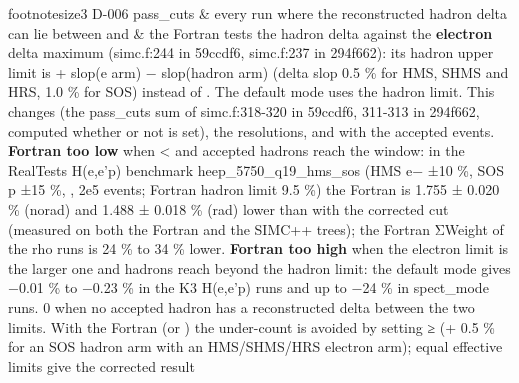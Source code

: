 \begin{simctable}{footnotesize}{3}
D-006 pass\_cuts & every run where the reconstructed hadron delta can lie between  and  & the Fortran tests the hadron delta against the \textbf{electron} delta maximum (simc.f:244 in 59ccdf6, simc.f:237 in 294f662): its hadron upper limit is  + slop(e arm) − slop(hadron arm) (delta slop 0.5 \% for HMS, SHMS and HRS, 1.0 \% for SOS) instead of . The default mode uses the hadron limit. This changes  (the pass\_cuts sum of simc.\allowbreak{}f:\allowbreak{}318-320 in 59ccdf6, 311-313 in 294f662, computed whether or not  is set), the resolutions,\allowbreak{} and with  the accepted events. \textbf{Fortran too low} when  <  and accepted hadrons reach the window: in the RealTests H(e,e'p) benchmark heep\_\allowbreak{}5750\_\allowbreak{}q19\_\allowbreak{}hms\_\allowbreak{}sos (HMS e− ±10 \%, SOS p ±15 \%, , 2e5 events; Fortran hadron limit 9.5 \%) the Fortran  is 1.755 ± 0.020 \% (norad) and 1.488 ± 0.018 \% (rad) lower than with the corrected cut (measured on both the Fortran and the SIMC++ trees); the Fortran ΣWeight of the rho runs is 24 \% to 34 \% lower. \textbf{Fortran too high} when the electron limit is the larger one and hadrons reach beyond the hadron limit: the default mode gives −0.01 \% to −0.23 \% in the K3 H(e,e'p) runs and up to −24 \% in spect\_mode runs. 0 when no accepted hadron has a reconstructed delta between the two limits. With the Fortran (or ) the under-count is avoided by setting  ≥  (+ 0.5 \% for an SOS hadron arm with an HMS/\allowbreak{}SHMS/\allowbreak{}HRS electron arm); equal effective limits give the corrected result \\

\end{simctable}
